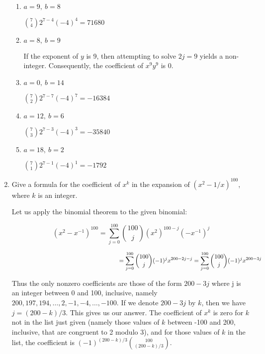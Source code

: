 \documentclass[11pt]{article}
\begin{document}
\begin{enumerate}[label=\textbf{\arabic*.}]
	\begin{enumerate}[label=\textbf{\alph*)}]
		\item $a = 9,\ b = 8$
		
		$\binom{7}{4} 2^{7 - 4}(-4)^4 = 71680$
		
		\item $a = 8,\ b = 9$
		
		If the exponent of $y$ is 9, then attempting to solve $2j = 9$ yields a non-integer. Consequently, the coefficient of $x^9y^9$ is 0.
		
		\item $a = 0,\ b = 14$
		
		$\binom{7}{2} 2^{7 - 7}(-4)^7 = -16384$
		
		\item $a = 12,\ b = 6$
		
		$\binom{7}{3} 2^{7 - 3}(-4)^3 = -35840$
		
		\item $a = 18,\ b = 2$
		
		$\binom{7}{1} 2^{7 - 1}(-4)^1 = -1792$
	\end{enumerate}

	\item Give a formula for the coefficient of $x^k$ in the expansion of $(x^2 - 1 / x)^{100}$, where $k$ is an integer.
	
	Let us apply the binomial theorem to the given binomial:
	
	$$(x^2 - x^{-1})^{100} = \sum_{j = 0}^{100} \binom{100}{j} (x^2)^{100 - j}(-x^{-1})^j$$
	
	$$\hspace{6.3cm} = \sum_{j = 0}^{100} \binom{100}{j} (-1)^jx^{200 - 2j - j} = \sum_{j = 0}^{100} \binom{100}{j} (-1)^jx^{200 - 3j}$$
	
	Thus the only nonzero coefficients are those of the form $200 - 3j$ where j is an integer between 0 and 100, inclusive, namely $200, 197, 194, \ldots, 2, -1, -4, \ldots, -100$. If we denote $200 - 3j$ by $k$, then we have $j = (200 - k) / 3$. This gives us our answer. The coefficient of $x^k$ is zero for $k$ not in the list just given (namely those values of $k$ between -100 and 200, inclusive, that are congruent to 2 modulo 3), and for those values of $k$ in the list, the coefficient is $(-1)^{(200 - k) / 3}\binom{100}{(200 - k) / 3}$.
\end{enumerate}
\end{document}
